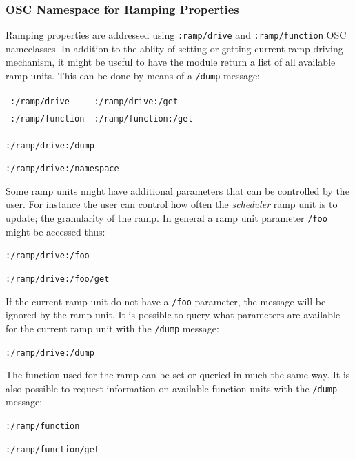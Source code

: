 \documentclass{NIME-alternate}
\begin{document}



\subsubsection{OSC Namespace for Ramping Properties} %
\label{ssub:osc_namespace_for_ramping_properties}

Ramping properties are addressed using \texttt{:ramp/drive} and \texttt{:ramp/function} OSC nameclasses. In addition to the ablity of setting or getting current ramp driving mechanism, it might be useful to have the module return a list of all available ramp units. This can be done by means of a \texttt{/dump} message:

\begin{tabular}{ll}
	\texttt{:/ramp/drive} & \texttt{:/ramp/drive:/get} \\
	\texttt{:/ramp/function}  & \texttt{:/ramp/function:/get} \\
\end{tabular}

\texttt{:/ramp/drive:/dump}

\texttt{:/ramp/drive:/namespace}

Some ramp units might have additional parameters that can be controlled by the user. For instance the user can control how often the \emph{scheduler} ramp unit is to update; the granularity of the ramp.  In general a ramp unit parameter \texttt{/foo} might be accessed thus:


\texttt{:/ramp/drive:/foo}

\texttt{:/ramp/drive:/foo/get}

If the current ramp unit do not have a \texttt{/foo} parameter, the message will be ignored by the ramp unit. It is possible to query what parameters are available for the current ramp unit with the \texttt{/dump} message:

\texttt{:/ramp/drive:/dump}

The function used for the ramp can be set or queried in much the same way. It is also possible to request information on available function units with the \texttt{/dump} message:

\texttt{:/ramp/function}

\texttt{:/ramp/function/get}
\end{document}
